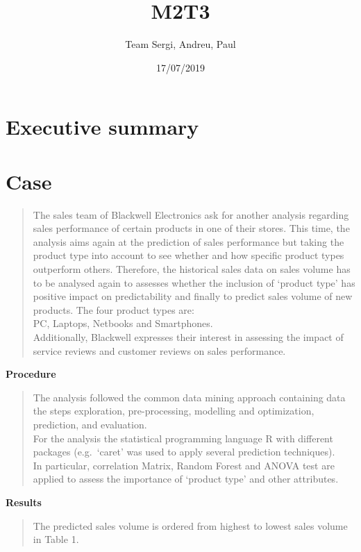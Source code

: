 \documentclass[]{article}
\title{M2T3}
\author{Team Sergi, Andreu, Paul}
\date{17/07/2019}
\begin{document}
\maketitle

\hypertarget{executive-summary}{%
\section{\texorpdfstring{\textbf{Executive
summary}}{Executive summary}}\label{executive-summary}}

\hypertarget{case}{%
\section{\texorpdfstring{\textbf{Case}}{Case}}\label{case}}

\begin{quote}
The sales team of Blackwell Electronics ask for another analysis
regarding sales performance of certain products in one of their stores.
This time, the analysis aims again at the prediction of sales
performance but taking the product type into account to see whether and
how specific product types outperform others. Therefore, the historical
sales data on sales volume has to be analysed again to assesses whether
the inclusion of `product type' has positive impact on predictability
and finally to predict sales volume of new products. The four product
types are:\\
PC, Laptops, Netbooks and Smartphones.\\
Additionally, Blackwell expresses their interest in assessing the impact
of service reviews and customer reviews on sales performance.
\end{quote}

\textbf{Procedure}

\begin{quote}
The analysis followed the common data mining approach containing data
the steps exploration, pre-processing, modelling and optimization,
prediction, and evaluation.\\
For the analysis the statistical programming language R with different
packages (e.g.~`caret' was used to apply several prediction
techniques).\\
In particular, correlation Matrix, Random Forest and ANOVA test are
applied to assess the importance of `product type' and other attributes.
\end{quote}

\textbf{Results}

\begin{quote}
The predicted sales volume is ordered from highest to lowest sales
volume in Table 1.
\end{quote}
\end{document}
